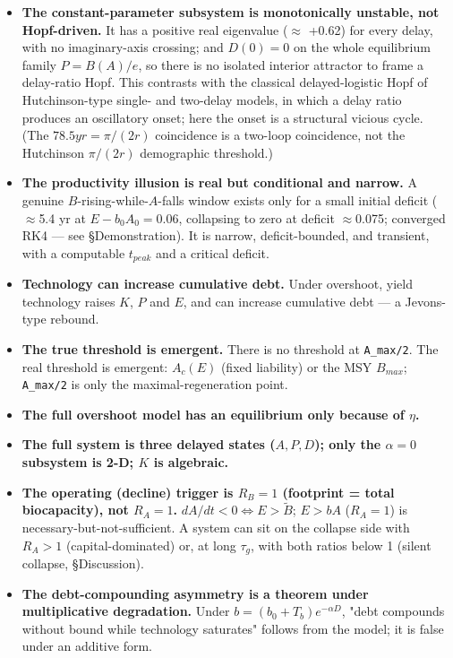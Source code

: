 \documentclass[11pt]{article}
\begin{document}
\begin{itemize}
\item \textbf{The constant-parameter subsystem is monotonically unstable, not Hopf-driven.} It has a positive real eigenvalue (\ensuremath{\approx{}} +0.62) for every delay, with no imaginary-axis crossing; and $D(0)=0$ on the whole equilibrium family $P=B(A)/e$, so there is no isolated interior attractor to frame a delay-ratio Hopf. This contrasts with the classical delayed-logistic Hopf of Hutchinson-type single- and two-delay models, in which a delay ratio produces an oscillatory onset; here the onset is a structural vicious cycle. (The $78.5 yr = \pi{}/(2r)$ coincidence is a two-loop coincidence, not the Hutchinson $\pi{}/(2r)$ demographic threshold.)
\item \textbf{The productivity illusion is real but conditional and narrow.} A genuine $B$-rising-while-$A$-falls window exists only for a small initial deficit (\ensuremath{\approx{}}5.4 yr at $E-b_{0}A_{0}=0.06$, collapsing to zero at deficit \ensuremath{\approx{}}0.075; converged RK4 — see §Demonstration). It is narrow, deficit-bounded, and transient, with a computable $t_{peak}$ and a critical deficit.
\item \textbf{Technology can increase cumulative debt.} Under overshoot, yield technology raises $K$, $P$ and $E$, and can increase cumulative debt — a Jevons-type rebound.
\item \textbf{The true threshold is emergent.} There is no threshold at \texttt{A\_max/2}. The real threshold is emergent: $A_{c}(E)$ (fixed liability) or the MSY $B_{max}$; \texttt{A\_max/2} is only the maximal-regeneration point.
\item \textbf{The full overshoot model has an equilibrium only because of $\eta{}$.}
\item \textbf{The full system is three delayed states ($A,P,D$); only the $\alpha{}=0$ subsystem is 2-D; $K$ is algebraic.}
\item \textbf{The operating (decline) trigger is $R_{B} = 1$ (footprint = total biocapacity), not $R_{A} = 1$.} $dA/dt < 0 \iff{} E > \tilde{B}$; $E > bA$ ($R_{A} = 1$) is necessary-but-not-sufficient. A system can sit on the collapse side with $R_{A} > 1$ (capital-dominated) or, at long $\tau{}_{g}$, with both ratios below 1 (silent collapse, §Discussion).
\item \textbf{The debt-compounding asymmetry is a theorem under multiplicative degradation.} Under $b = (b_{0}+T_{b})e^{-\alpha{}D}$, "debt compounds without bound while technology saturates" follows from the model; it is false under an additive form.
\end{itemize}
\end{document}
